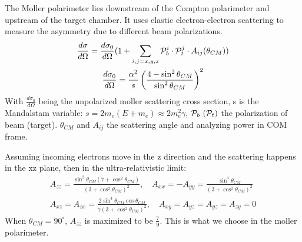 The Moller polarimeter lies downstream of the Compton polarimeter and upstream 
of the target chamber. It uses elastic electron-electron scattering to measure the
asymmetry due to different beam polarizations. 
\begin{equation}
    \begin{gathered}
	\frac{d\sigma}{d\Omega} = \frac{d\sigma_0}{d\Omega} (1 + \sum_{i,j=x,y,z} \mathcal{P}_b^i \cdot \mathcal{P}_t^j \cdot A_{ij}(\theta_{CM})) \\
	\frac{d\sigma_0}{d\Omega} = \frac{\alpha^2}{s} \left( \frac{4 - \sin^2\theta_{CM}}{\sin^2\theta_{CM}}\right)^2 
    \end{gathered}
    \label{eq:moller_xsection}
\end{equation}
With $\frac{d\sigma_0}{d\Omega}$ being the unpolarized moller scattering cross section,
s is the Mandalstam variable: $s = 2m_e(E+m_e) \approx 2m_e^2\gamma$,
$\mathcal{P}_b \ (\mathcal{P}_t)$ the polarization of beam (target). 
$\theta_{CM}$ and $A_{ij}$ the scattering angle and analyzing power in COM frame. 

Assuming incoming electrons move in the z direction and the scattering happens
in the xz plane, then in the ultra-relativistic limit:
\begin{equation}
    \begin{gathered}
	A_{zz} = \frac{\sin^2\theta_{CM} (7 + \cos^2\theta_{CM})}{(3+\cos^2\theta_{CM})^2},
	\quad
	A_{xx} = -A_{yy} = \frac{\sin^4\theta_{CM}}{(3+\cos^2\theta_{CM})^2}	\\
	A_{xz} = A_{zx} = \frac{2\sin^4\theta_{CM}\cos\theta_{CM}}{\gamma(3+\cos^2\theta_{CM})^2},
	\quad
	A_{xy} = A_{yz} = A_{yz} = A_{zy} = 0
    \end{gathered}
\end{equation}
When $\theta_{CM} = 90^\circ$, $A_{zz}$ is maximized to be $\frac{7}{9}$. This
is what we choose in the moller polarimeter.

